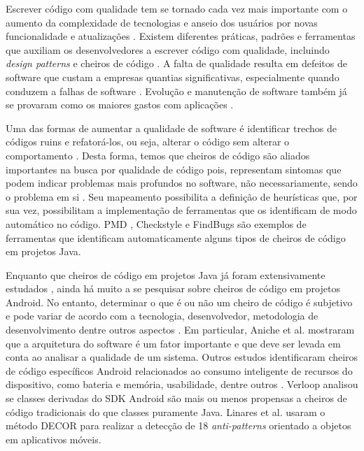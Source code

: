 Escrever código com qualidade tem se tornado cada vez mais importante com o aumento da complexidade de tecnologias e anseio dos usuários por novas funcionalidade e atualizações \cite{Hecht2015,MobileSmells:13}. Existem diferentes práticas, padrões e ferramentas que auxiliam os desenvolvedores a escrever código com qualidade, incluindo \textit{design patterns} \cite{gof} e cheiros de código \cite{Refactoring:99}. A falta de qualidade resulta em defeitos de software que custam a empresas quantias significativas, especialmente quando conduzem a falhas de software \cite{Nagappan:2005, briand1993modeling}. Evolução e manutenção de software também já se provaram como os maiores gastos com aplicações \cite{RefactoringAndImprovements:10}.

Uma das formas de aumentar a qualidade de software é identificar trechos de códigos ruins e refatorá-los, ou seja, alterar o código sem alterar o comportamento \cite{Refactoring:99}. Desta forma, temos que cheiros de código são aliados importantes na busca por qualidade de código pois, representam sintomas que podem indicar problemas mais profundos no software, não necessariamente, sendo o problema em si \cite{CodeSmell:06}. Seu mapeamento possibilita a definição de heurísticas que, por sua vez, possibilitam a implementação de ferramentas que os identificam de modo automático no código. PMD \cite{PMD2016}, Checkstyle e FindBugs são exemplos de ferramentas que identificam automaticamente alguns tipos de cheiros de código em projetos Java. 

Enquanto que cheiros de código em projetos Java já foram extensivamente estudados \cite{Riel, Refactoring:99, Martin:2008:CCH:1388398}, ainda há muito a se pesquisar sobre cheiros de código em projetos Android. No entanto, determinar o que é ou não um cheiro de código é subjetivo e pode variar de acordo com a tecnologia, desenvolvedor, metodologia de desenvolvimento dentre outros aspectos \cite{WikiCodeSmell}. Em particular, Aniche et al. \cite{MvcSmells:16,aniche2016satt} mostraram que a arquitetura do software é um fator importante e que deve ser levada em conta ao analisar a qualidade de um sistema. Outros estudos identificaram cheiros de código específicos Android relacionados ao consumo inteligente de recursos do dispositivo, como bateria e memória, usabilidade, dentre outros \cite{EnergyAndroidSmells, ReimannBrylski2013}. Verloop \cite{MobileSmells:13} analisou se classes derivadas do SDK Android são mais ou menos propensas a cheiros de código tradicionais do que classes puramente Java. Linares et al. \cite{DomainMatters} usaram o método DECOR para realizar a detecção de 18 \textit{anti-patterns} orientado a objetos em aplicativos móveis.


